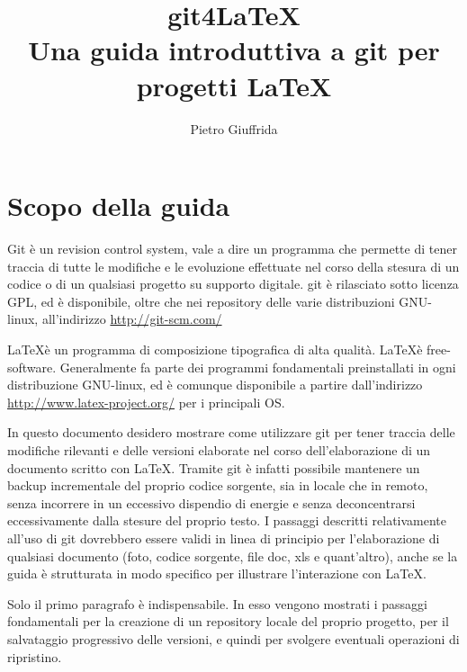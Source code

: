 \documentclass[a4paper,12pt,oneside]{article}
\begin{document}

\title{git4\LaTeX \\
  Una guida introduttiva a git per progetti \LaTeX}
\author{Pietro Giuffrida}
\maketitle

\tableofcontents

\newpage
\section{Scopo della guida}
Git è un revision control system, vale a dire un programma che permette di
tener traccia di tutte le modifiche e le evoluzione effettuate nel corso della
stesura di un codice o di un qualsiasi progetto su supporto digitale. git è
rilasciato sotto licenza GPL, ed è disponibile, oltre che nei repository delle
varie distribuzioni GNU-linux, all'indirizzo \url{http://git-scm.com/}

\LaTeX è un programma di composizione tipografica di alta qualità. \LaTeX è
free-software. Generalmente fa parte dei programmi fondamentali preinstallati in
ogni distribuzione GNU-linux, ed è comunque disponibile a partire dall'indirizzo
\url{http://www.latex-project.org/} per i principali OS.

In questo documento desidero mostrare come utilizzare git per tener traccia
delle modifiche rilevanti e delle versioni elaborate nel corso dell'elaborazione
di un documento scritto con \LaTeX. Tramite git è infatti possibile mantenere un
backup incrementale del proprio codice sorgente, sia in locale che in remoto,
senza incorrere in un eccessivo dispendio di energie e senza deconcentrarsi
eccessivamente dalla stesure del proprio testo. I passaggi descritti
relativamente all'uso di git dovrebbero essere validi in linea di principio per
l'elaborazione di qualsiasi documento (foto, codice sorgente, file doc, xls
e quant'altro), anche se la guida è strutturata in modo specifico per
illustrare l'interazione con \LaTeX.

Solo il primo paragrafo è indispensabile. In esso vengono mostrati i passaggi
fondamentali per la creazione di un repository locale del proprio progetto, per
il salvataggio progressivo delle versioni, e quindi per svolgere eventuali
operazioni di ripristino.
\end{document}
